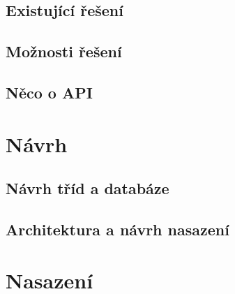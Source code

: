 \documentclass[thesis=B,czech]{FITthesis}[2012/06/26]
\begin{document}
\section{Existující řešení}


\section{Možnosti řešení}


\section{Něco o API}


\chapter{Návrh}

\section{Návrh tříd a databáze}


\section{Architektura a návrh nasazení}







\chapter{Nasazení}

\end{document}
